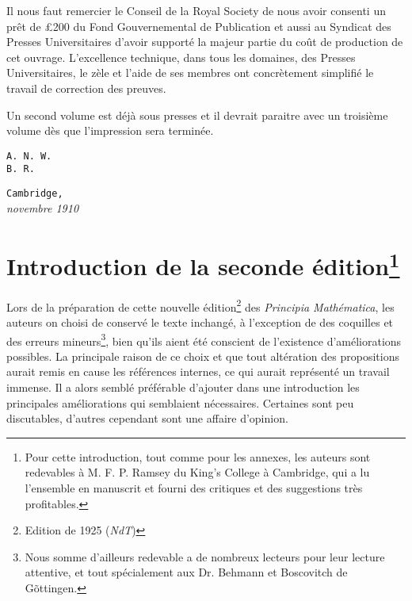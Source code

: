 \documentclass[a4paper]{book}
\begin{document}
Il nous faut remercier le Conseil de la Royal Society de nous avoir consenti un prêt de £200 du Fond Gouvernemental de Publication et aussi au Syndicat des Presses Universitaires d'avoir supporté la majeur partie du coût de production de cet ouvrage. L'excellence technique, dans tous les domaines, des Presses Universitaires, le zèle et l'aide de ses membres ont concrètement simplifié le travail de correction des preuves. 
 
Un second volume est déjà sous presses et il devrait paraitre avec un troisième volume dès que l'impression sera terminée.
\begin{flushright}
\texttt{A. N. W.\\
B. R.}
\end{flushright}  
\texttt{Cambridge,}\\
\textit{novembre 1910}
\tableofcontents

\chapter*{Introduction de la seconde édition\footnote{Pour cette introduction, tout comme pour les annexes, les auteurs sont redevables à M. F. P. Ramsey du King's College à Cambridge, qui a lu l'ensemble en manuscrit et fourni des critiques et des suggestions très profitables.}}
Lors de la préparation de cette nouvelle édition\footnote{Edition de 1925 (\textit{NdT})}  des \textit{Principia Mathématica}, les auteurs on choisi de conservé le texte inchangé, à l'exception de des coquilles et des erreurs mineurs\footnote{Nous somme d'ailleurs redevable a de nombreux lecteurs pour leur lecture attentive, et tout spécialement aux Dr. Behmann et Boscovitch de Gõttingen.}, bien qu'ils aient été conscient de l'existence d'améliorations possibles. La principale raison de ce choix et que tout altération des propositions aurait remis en cause les références internes, ce qui aurait représenté un travail immense. Il a alors semblé préférable d'ajouter dans une introduction les principales améliorations qui semblaient nécessaires. Certaines sont peu discutables, d'autres cependant sont une affaire d'opinion.


















\mainmatter
\end{document}

